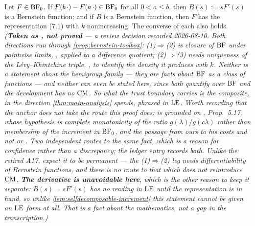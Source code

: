 \begin{lemma}\label{lem:selfdecomposable-derivative}
Let $F \in \mathrm{BF}_0$. If $F(b\,\cdot) - F(a\,\cdot) \in \mathrm{BF}_0$ for all $0 < a \le b$, then
$B(s) := sF'(s)$ is a Bernstein function; and if $B$ is a Bernstein function, then $F$ has the
representation (7.1) with $k$ nonincreasing. The converse of each also holds.
\statusT\quad\emph{(\textbf{Taken as , not proved} --- a review decision recorded
2026-08-10. Both directions run through \ref{prop:bernstein-toolbox}: (1)$\Rightarrow$(2) is
closure of $\mathrm{BF}$ under pointwise limits, , applied to a difference quotient;
(2)$\Rightarrow$(3) needs uniqueness of the Lévy--Khintchine triple, , to identify the
density it produces with $k$. Neither is a statement about the hemigroup family --- they are
facts about $\mathrm{BF}$ as a class of functions --- and neither can even be \emph{stated} here, since
both quantify over $\mathrm{BF}$ and the development has no $\mathrm{CM}$. So what the trust boundary carries is
the composite, in the direction \ref{thm:main-analysis} spends, phrased in $\mathrm{LE}$. Worth recording that the \emph{anchor} does not take the route this
proof does:  is grounded on , Prop.~5.17, whose
hypothesis is complete monotonicity of the ratio $g(\lambda)/g(c\lambda)$ rather than membership
of the increment in $\mathrm{BF}_0$, and the passage from ours to his costs  and not
 or . Two independent routes to the same fact, which is a reason for
confidence rather than a discrepancy; the ledger entry records both. Unlike the retired A17, expect it to be permanent --- the
(1)$\Rightarrow$(2) leg needs differentiability of Bernstein functions, and there is no route to
that which does not reintroduce $\mathrm{CM}$.
\textbf{The derivative is unavoidable here}, which is the other reason to keep it separate:
$B(s) = sF'(s)$ has no reading in $\mathrm{LE}$ until the representation is in hand, so unlike
\ref{lem:selfdecomposable-increment} this statement cannot be given an $\mathrm{LE}$ form at all. That
is a fact about the mathematics, not a gap in the transcription.)}
\end{lemma}

